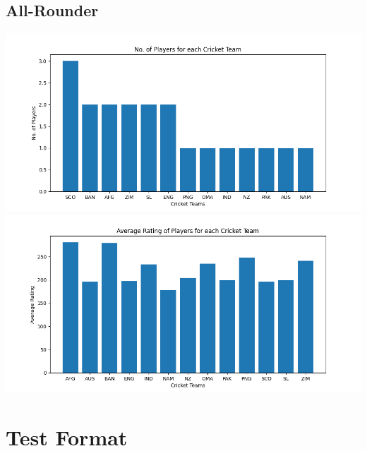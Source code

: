 \documentclass{article}
\begin{document}
\begin{normalsize}
            \subsection{All-Rounder}\label{subsec:all-rounder2}
                \includegraphics[scale=0.75]{odi_all-rounder_3-10-2023-1}
                \includegraphics[scale=0.75]{odi_all-rounder_3-10-2023-2}

        \vspace{2em}

        \section{Test Format}\label{sec:test-format}

\end{normalsize}
\end{document}
